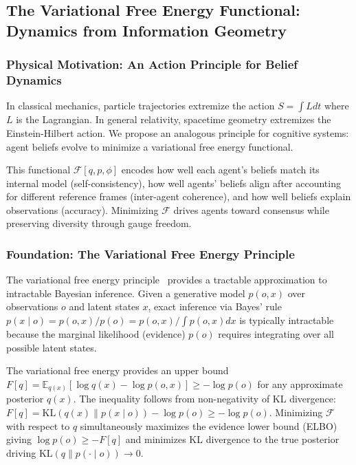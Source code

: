 \documentclass[11pt]{article}
\begin{document}
\subsection{The Variational Free Energy Functional: Dynamics from Information Geometry}

\subsubsection{Physical Motivation: An Action Principle for Belief Dynamics}

In classical mechanics, particle trajectories extremize the action $S = \int L  dt$ where $L$ is the Lagrangian. In general relativity, spacetime geometry extremizes the Einstein-Hilbert action. We propose an analogous principle for cognitive systems: agent beliefs evolve to minimize a variational free energy functional.

This functional $\mathcal{F}[q, p, \phi]$ encodes how well each agent's beliefs match its internal model (self-consistency), how well agents' beliefs align after accounting for different reference frames (inter-agent coherence), and how well beliefs explain observations (accuracy). Minimizing $\mathcal{F}$ drives agents toward consensus while preserving diversity through gauge freedom.

\subsubsection{Foundation: The Variational Free Energy Principle}

The variational free energy principle~\cite{Friston2010, parr2022active} provides a tractable approximation to intractable Bayesian inference. Given a generative model $p(o, x)$ over observations $o$ and latent states $x$, exact inference via Bayes' rule $p(x \mid o) = p(o, x)/p(o) = p(o, x)/\int p(o, x)  dx$ is typically intractable because the marginal likelihood (evidence) $p(o)$ requires integrating over all possible latent states.

The variational free energy provides an upper bound $F[q] = \mathbb{E}_{q(x)}[\log q(x) - \log p(o, x)] \geq -\log p(o)$ for any approximate posterior $q(x)$. The inequality follows from non-negativity of KL divergence: $F[q] = \mathrm{KL}(q(x) \| p(x \mid o)) - \log p(o) \geq -\log p(o)$. Minimizing $\mathcal{F}$ with respect to $q$ simultaneously maximizes the evidence lower bound (ELBO) giving $\log p(o) \geq -F[q]$ and minimizes KL divergence to the true posterior driving $\mathrm{KL}(q \| p(\cdot \mid o)) \to 0$.
\end{document}
